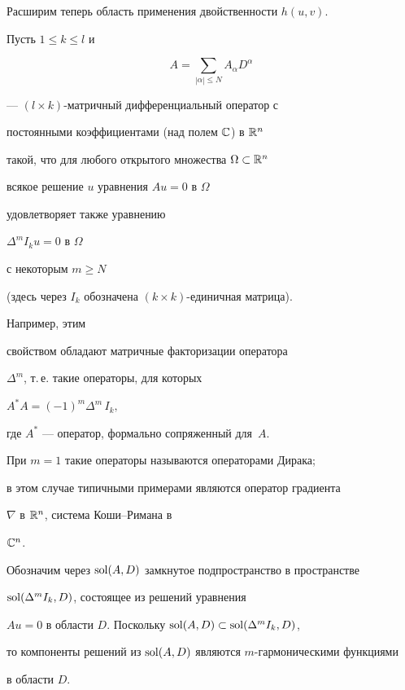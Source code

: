 Расширим теперь область применения двойственности $h(u,v)$.


Пусть $1\leq k\leq l$ и


$$


A = \sum_{|\alpha | \leq N} A_\alpha D^\alpha


$$


--- $(l\times k)$-матричный дифференциальный оператор с


постоянными коэффициентами (над полем $\Bbb C$) в ${\Bbb R}^n$


такой, что для любого открытого множества $\Omega \subset {\Bbb R}^n$


всякое решение $u$ уравнения $Au = 0 \mbox{ в } \Omega$


удовлетворяет также уравнению


$\Delta ^m I_k u = 0 \mbox{ в } \Omega$


с некоторым $m \geq N$


(здесь через $I_k$ обозначена $(k\times k)$-единичная матрица).





Например, этим


свойством обладают матричные факторизации оператора


$\Delta ^m$, т.\,е. такие операторы, для которых


$ A^*A = (-1)^m \Delta ^m \, I_k,$


где $A^*$ --- оператор, формально сопряженный для~$A$.


При $m=1$ такие операторы называются операторами Дирака;


в этом случае типичными примерами являются оператор градиента


$\nabla$ в ${\Bbb R}^n$, система Коши--Римана в


${\Bbb C}^n$.





Обозначим через $\operatorname{sol} (A,D)$ замкнутое подпространство в пространстве


$\operatorname{sol} (\Delta ^m I_k, D)$, состоящее из решений уравнения


$Au= 0$ в области $D$. Поскольку $\operatorname{sol} (A,D)\subset \operatorname{sol} (\Delta ^m I_k, D)$,


то компоненты решений из $\operatorname{sol} (A,D)$ являются $m$-гармоническими функциями


в области $D$.





